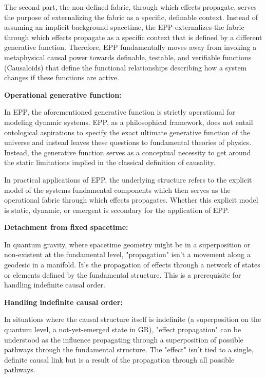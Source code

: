 \documentclass{article}
\begin{document}
The second part, the non-defined fabric, through which effects propagate, serves the purpose of externalizing the fabric as a specific, definable context. Instead of assuming an implicit background spacetime, the EPP externalizes the fabric through which effects propagate as a specific context that is defined by a different generative function.
Therefore, EPP fundamentally moves away from invoking a metaphysical causal power towards definable, testable, and verifiable functions (Causaloids) that define the functional relationships describing how a system changes if these functions   are active.

\newpage

\textbf{Operational generative function:}

In EPP, the aforementioned generative function is strictly operational for modeling dynamic systems. EPP, as a philosophical framework, does not entail ontological aspirations to specify the exact ultimate generative function of the universe and instead leaves these questions to fundamental theories of physics. Instead, the generative function serves as a conceptual necessity to get around the static limitations implied in the classical definition of causality.

In practical applications of EPP, the underlying structure refers to the explicit model of the systems fundamental components which then serves as the operational fabric through which effects propagates. Whether this explicit model is static, dynamic, or emergent is secondary for the application of EPP.

\textbf{Detachment from fixed spacetime:}

In quantum gravity, where spacetime geometry might be in a superposition or non-existent at the fundamental level, "propagation" isn't a movement along a geodesic in a manifold. It's the propagation of effects through a network of states or elements defined by the fundamental structure. This is a prerequisite for handling indefinite causal order.


\textbf{Handling indefinite causal order:}

In situations where the causal structure itself is indefinite (a superposition on the quantum level, a not-yet-emerged state in GR), "effect propagation" can be understood as the influence propagating through a superposition of possible pathways through the fundamental structure. The "effect" isn't tied to a single, definite causal link but is a result of the propagation through all possible pathways.
\end{document}

